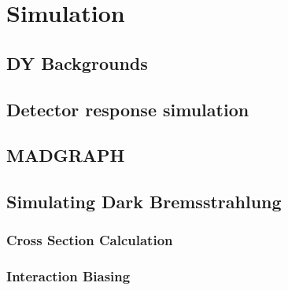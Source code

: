 \chapter{Simulation}
\label{simulation_chapter}
\section{DY Backgrounds}

\section{Detector response simulation}

\section{MADGRAPH}

\section{Simulating Dark Bremsstrahlung}

\subsection{Cross Section Calculation}

\subsection{Interaction Biasing}


